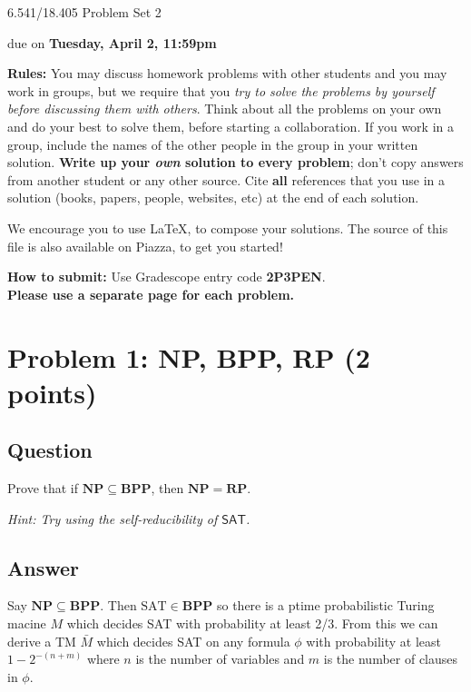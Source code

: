 \documentclass{article}
\newcommand{\NP}{\mathbf{NP}}
\newcommand{\BPP}{\mathbf{BPP}}
\newcommand{\RP}{\mathbf{RP}}
\begin{document}
	
	
	\begin{center}
		\Large
		6.541/18.405 Problem Set 2
		
		\vspace{3pt}
		\normalsize
		due on {\bf Tuesday, April 2, 11:59pm}
	\end{center}
	
	{\bf Rules:} You may discuss homework problems with other students and you may work in groups, but we require that you {\em try to solve the problems by yourself before discussing them with others}. Think about all the problems on your own and do your best to solve them, before starting a collaboration. If you work in a group, include the names of the other people in the group in your written solution. {\bf Write up your {\em own} solution to every problem}; don't copy answers from another student or any other source. Cite {\bf all} references that you use in a solution (books, papers, people, websites, etc) at the end of each solution. 
	
	We encourage you to use \LaTeX, to compose your solutions. The source of this file is also available on Piazza, to get you started!
	
	{\bf How to submit:} Use Gradescope entry code \textbf{2P3PEN}.\\ \textbf{\large Please use a separate page for each problem.} 

\newpage
\section*{Problem 1: NP, BPP, RP (2 points)}

\subsection*{Question}
Prove that if $\NP \subseteq \BPP$, then $\NP = \RP$.

\emph{Hint: Try using the self-reducibility of $\mathsf{SAT}$.}

\subsection*{Answer}
Say $\NP \subseteq \BPP$.  Then $\text{SAT} \in \BPP$ so there is a ptime probabilistic Turing macine $M$ which decides SAT with probability at least 2/3.
From this we can derive a TM $\bar{M}$ which decides SAT on any formula $\phi$ with probability at least $1 - 2^{-(n + m)}$ where $n$ is the number of variables and $m$ is the number of clauses in $\phi$.
\end{document}
